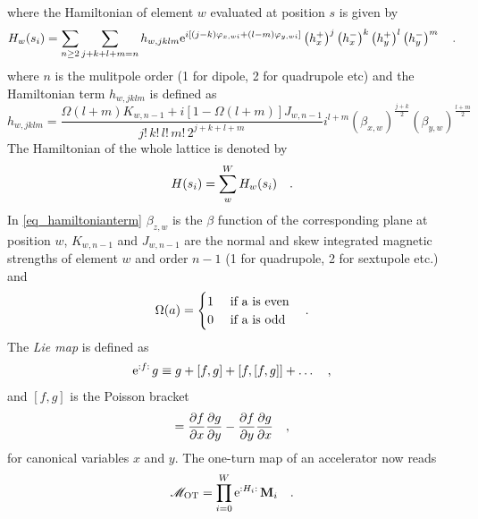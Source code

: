 where the Hamiltonian of element $w$ evaluated at position $s$ is given by
%
\begin{equation}
    H_w(s_i) = \sum\limits_{n\geq2} \sum\limits_{j+k+l+m=n} h_{w,jklm}
    \text{e}^{i \left[
        (j-k) \varphi_{x,wi} + (l-m) \varphi_{y,wi}
    \right]}
    \left(h_x^+\right)^j
    \left(h_x^-\right)^k
    \left(h_y^+\right)^l
    \left(h_y^-\right)^m
    \quad .
\end{equation}
%
where $n$ is the mulitpole order (1 for dipole, 2 for quadrupole etc)
and the Hamiltonian term $h_{w,jklm}$ is defined as
%
\begin{equation}
    h_{w,jklm} = 
    \frac{
        \Omega(l+m) K_{w,n-1} + i\left[1-\Omega(l+m)\right] J_{w,n-1}
    }{
        j!\,k!\,l!\,m!\,2^{j+k+l+m}
    }
    i^{l+m}
    (\beta_{x,w})^{\frac{j+k}{2}}
    (\beta_{y,w})^{\frac{l+m}{2}}
    \label{eq_hamiltonianterm}
\end{equation}
%
The Hamiltonian of the whole lattice is denoted by
%
\begin{equation}
    H(s_i) = \sum\limits_w^W H_w(s_i)
    \label{eq_Hamil_sa}
    \quad .
\end{equation}
%
In \eqref{eq_hamiltonianterm} $\beta_{z,w}$ is the $\beta$ function of the corresponding plane at position $w$,
$K_{w,n-1}$ and $J_{w,n-1}$ are the normal and skew integrated magnetic strengths of element $w$ and order $n-1$ (1 for quadrupole, 2 for sextupole etc.)
and 
%
\begin{equation}
    \Omega(a) = 
    \begin{cases}
        1 &\text{ if a is even} \\
        0 &\text{ if a is odd} \\
    \end{cases}
    \quad .
\end{equation}
%
The \emph{Lie map} is defined as
%
\begin{equation}
    \text{e}^{{:}f{:}\,}g \equiv g + [f,g] + [f, [f,g]] + \ldots
    \quad ,
    \label{eq_liemap}
\end{equation}
%
and $[f,g]$ is the Poisson bracket
%
\begin{equation}
    [f,g] = 
    \frac{\partial f}{\partial x} \frac{\partial g}{\partial y}
    - \frac{\partial f}{\partial y}\frac{\partial g}{\partial x}
    \komma
\end{equation}
for canonical variables $x$ and $y$.
%
The one-turn map of an accelerator now reads
%
\begin{equation}
    \mathscr{M}_\text{OT} = \prod\limits_{i=0}^W \text{e}^{{:}H_i{:}\,} \mathbf{M}_i
    \quad .
\end{equation}

